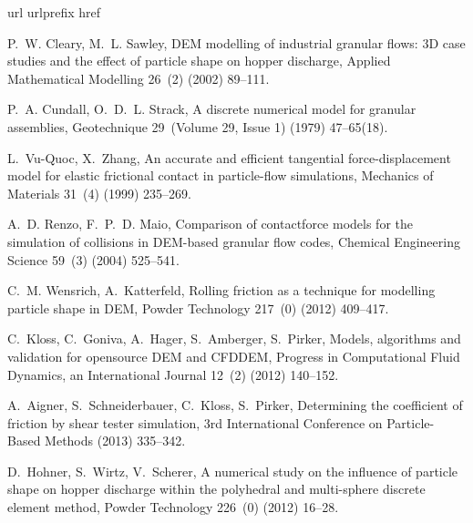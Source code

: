 \documentclass{llncs}
\begin{document}

% 
% 
% 
\begin{thebibliography}{10}
\expandafter\ifx\csname url\endcsname\relax
  \def\url#1{\texttt{#1}}\fi
\expandafter\ifx\csname urlprefix\endcsname\relax\def\urlprefix{URL }\fi
\expandafter\ifx\csname href\endcsname\relax
  \def\href#1#2{#2} \def\path#1{#1}\fi

P.~W. Cleary, M.~L. Sawley, DEM modelling of industrial granular flows: 3D case
  studies and the effect of particle shape on hopper discharge, Applied
  Mathematical Modelling 26~(2) (2002) 89--111.

P.~A. Cundall, O.~D.~L. Strack, A discrete numerical model for granular
  assemblies, Geotechnique 29~(Volume 29, Issue 1) (1979) 47--65(18).

L.~Vu-Quoc, X.~Zhang, An accurate and efficient tangential force-displacement
  model for elastic frictional contact in particle-flow simulations, Mechanics
  of Materials 31~(4) (1999) 235--269.

A.~D. Renzo, F.~P.~D. Maio, Comparison of contactforce models for the
  simulation of collisions in DEM-based granular flow codes, Chemical
  Engineering Science 59~(3) (2004) 525--541.

C.~M. Wensrich, A.~Katterfeld, Rolling friction as a technique for modelling
  particle shape in DEM, Powder Technology 217~(0) (2012) 409--417.

C.~Kloss, C.~Goniva, A.~Hager, S.~Amberger, S.~Pirker, Models, algorithms and
  validation for opensource DEM and CFDDEM, Progress in Computational Fluid
  Dynamics, an International Journal 12~(2) (2012) 140--152.

A.~Aigner, S.~Schneiderbauer, C.~Kloss, S.~Pirker, Determining the coefficient
  of friction by shear tester simulation, 3rd International Conference on
  Particle-Based Methods (2013) 335--342.

D.~Hohner, S.~Wirtz, V.~Scherer, A numerical study on the influence of particle
  shape on hopper discharge within the polyhedral and multi-sphere discrete
  element method, Powder Technology 226~(0) (2012) 16--28.


\end{thebibliography}
\end{document}
